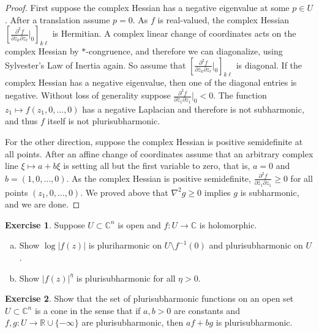 \documentclass[12pt,openany]{book}
\newcommand{\sabs}[1]{\lvert {#1} \rvert}
\newcommand{\C}{{\mathbb{C}}}
\newcommand{\R}{{\mathbb{R}}}
\theoremstyle{plain}
\theoremstyle{remark}
\theoremstyle{definition}
\newenvironment{exbox}{%
    \def\FrameCommand{\vrule width 1pt \relax\hspace{10pt}}%
    \MakeFramed{\advance\hsize-\width\FrameRestore}%
}{%
    \endMakeFramed
}
\newenvironment{exparts}{%
    \leavevmode\begin{enumerate}[a),noitemsep,topsep=0pt,parsep=0pt,partopsep=0pt]
}{%
    \end{enumerate}
}
\theoremstyle{exercise}
\newtheorem{exercise}{Exercise}[section]
\theoremstyle{example}
\begin{document}
\begin{proof}
First suppose the complex Hessian has a negative eigenvalue at some $p \in U$.
After a translation assume $p=0$.
As $f$ is real-valued, the complex Hessian
$\left[
\frac{\partial^2 f}{\partial \bar{z}_k \partial z_\ell}
\Big|_0
\right]_{k\ell}$ is Hermitian.  A complex linear change of coordinates
acts on the complex Hessian by $*$-congruence, and therefore we can
diagonalize,
using Sylvester's Law of Inertia again.
So assume that
$\left[
\frac{\partial^2 f}{\partial \bar{z}_k \partial z_\ell}
\Big|_0
\right]_{k\ell}$ is diagonal.  If the complex Hessian has a negative eigenvalue, then
one of the diagonal entries is negative.
Without loss of generality suppose
$\frac{\partial^2 f}{\partial \bar{z}_1 \partial z_1}\Big|_0 < 0$.
The function $z_1 \mapsto f(z_1,0,\ldots,0)$ has
a negative Laplacian and therefore is not subharmonic, and thus $f$ itself
is not plurisubharmonic.

For the other direction, suppose the complex Hessian is positive
semidefinite at all points.
After an affine change of coordinates assume that an arbitrary
complex line $\xi \mapsto a+b\xi$ is setting all but the first variable to
zero, that is, $a=0$ and $b=(1,0,\ldots,0)$.
As the complex Hessian is positive semidefinite,
$\frac{\partial^2 f}{\partial \bar{z}_1 \partial z_1} \geq 0$ for all
points $(z_1,0,\ldots,0)$.  We proved above that $\nabla^2 g \geq 0$
implies $g$ is subharmonic, and we are done.
\end{proof}

\begin{exbox}
\begin{exercise} \label{exercise:modholplush}
Suppose $U \subset \C^n$ is open and $f \colon U \to \C$ is holomorphic.
\begin{exparts}
\item
Show $\log \sabs{f(z)}$ is pluriharmonic on $U \setminus f^{-1}(0)$ and
plurisubharmonic on $U$.
\item
Show $\sabs{f(z)}^{\eta}$ is plurisubharmonic for all $\eta > 0$.
\end{exparts}
\end{exercise}

\begin{exercise}
Show that the set of plurisubharmonic functions on an open set $U \subset \C^n$
is a cone in the sense that if $a,b > 0$ are constants and
$f, g \colon U \to \R \cup \{ -\infty \}$ are plurisubharmonic, then
$a f + b g$ is plurisubharmonic.
\end{exercise}
\end{exbox}
\end{document}
